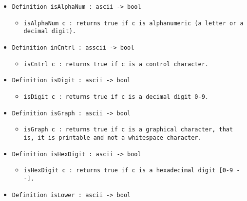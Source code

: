 \documentclass[11pt]{report}
\begin{document}
\begin{itemize}
\item  \texttt{Definition isAlphaNum : ascii -> bool}

\begin{itemize}
\item  \begin{flushleft} \texttt{isAlphaNum c :  returns true if c is alphanumeric (a letter or a decimal digit).} \end{flushleft}
\end{itemize}

\item  \texttt{Definition inCntrl : asscii -> bool}

\begin{itemize}
\item  \texttt{isCntrl c :  returns true if c is a control character.}
\end{itemize}

\item  \texttt{Definition isDigit : ascii -> bool}

\begin{itemize}
\item \texttt{isDigit c :  returns true if c is a decimal digit 0-9.}
\end{itemize}

\item  \texttt{Definition isGraph : ascii -> bool}

\begin{itemize}
\item  \begin{flushleft} \texttt{isGraph c :  returns true if c is a graphical character, that is, it is printable and not a whitespace character.} \end{flushleft}
\end{itemize}

\item  \texttt{Definition isHexDigit : ascii -> bool}

\begin{itemize}
\item  \begin{flushleft} \texttt{isHexDigit c :  returns true if c is a hexadecimal digit [0-9 --].} \end{flushleft}



\end{itemize}

\item  \texttt{Definition isLower : ascii -> bool}


\end{itemize}
\end{document}
